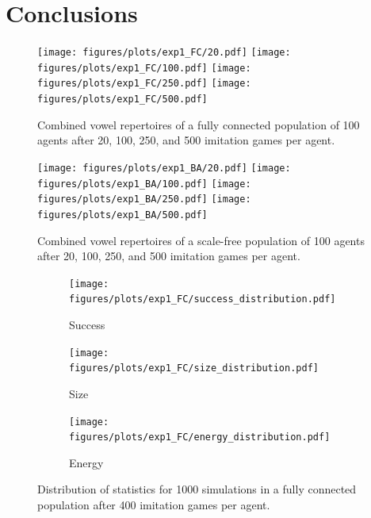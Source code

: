 \documentclass{article}
\begin{document}
\section{Conclusions\label{sec:conclusion}}

\begin{figure}[t]
    \centering
    \texttt{[image: figures/plots/exp1\_FC/20.pdf]}
    \texttt{[image: figures/plots/exp1\_FC/100.pdf]}
    \texttt{[image: figures/plots/exp1\_FC/250.pdf]}
    \texttt{[image: figures/plots/exp1\_FC/500.pdf]}
    \caption{Combined vowel repertoires of a fully connected population of 100 agents after 20, 100, 250, and 500
        imitation games per agent.}
    \label{fig:FC_res}
\end{figure}

\begin{figure}[t]
    \centering
    \texttt{[image: figures/plots/exp1\_BA/20.pdf]}
    \texttt{[image: figures/plots/exp1\_BA/100.pdf]}
    \texttt{[image: figures/plots/exp1\_BA/250.pdf]}
    \texttt{[image: figures/plots/exp1\_BA/500.pdf]}
    \caption{Combined vowel repertoires of a scale-free population of 100 agents after 20, 100, 250, and 500
        imitation games per agent.}
    \label{fig:BA_res}
\end{figure}

\begin{figure}[b]
    \centering
    \begin{subfigure}{.33\textwidth}
        \centering
        \texttt{[image: figures/plots/exp1\_FC/success\_distribution.pdf]}
        \caption{Success}
        \label{fig:FC_stats_success}
    \end{subfigure}%
    \begin{subfigure}{.33\textwidth}
        \centering
        \texttt{[image: figures/plots/exp1\_FC/size\_distribution.pdf]}
        \caption{Size}
        \label{fig:FC_stats_size}
    \end{subfigure}%
    \begin{subfigure}{.33\textwidth}
        \centering
        \texttt{[image: figures/plots/exp1\_FC/energy\_distribution.pdf]}
        \caption{Energy}
        \label{fig:FC_stats_energy}
    \end{subfigure}%
    \caption{Distribution of statistics for 1000 simulations in a fully connected population after 400 imitation games
        per agent.}
    \label{fig:FC_stats}
\end{figure}
\end{document}
